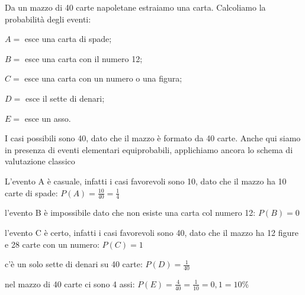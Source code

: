\begin{esempio}
Da un mazzo di 40 carte napoletane estraiamo una carta. Calcoliamo la 
probabilità degli eventi:
\begin{itemize*}
\item \(A=\) esce una carta di spade;
\item \(B=\) esce una carta con il numero 12;
\item \(C=\) esce una carta con un numero o una figura;
\item \(D=\) esce il sette di denari;
\item \(E=\) esce un asso.
\end{itemize*}
I casi possibili sono 40, dato che il mazzo è formato da 40 carte. Anche qui 
siamo in presenza di eventi elementari equiprobabili, applichiamo ancora lo 
schema di valutazione classico
\begin{itemize*}
\item L'evento A è casuale, infatti i casi favorevoli sono 10, dato che il 
mazzo 
ha 10 carte di spade: \(P(A)=\frac{10}{40}=\frac 1 4\)
\item l'evento B è impossibile dato che non esiste una carta col numero 12: \( 
P(B)=0 \)
\item l'evento C è certo, infatti i casi favorevoli sono 40, dato che il 
mazzo 
ha 12 figure e 28 carte con un numero: \(P(C)=1\)
\item c'è un solo sette di denari su 40 carte: \(P(D)=\frac 1{40}\)
\item nel mazzo di 40 carte ci sono 4 assi: \(P(E)=\frac 4{40}=\frac 
1{10}=0,1=10\%\)
\end{itemize*}
\end{esempio}

